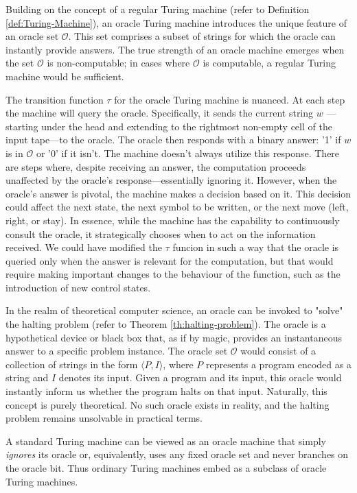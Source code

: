 Building on the concept of a regular Turing machine (refer to Definition \ref{def:Turing-Machine}), an oracle Turing machine introduces the unique feature of an oracle set $\mathcal{O}$. This set comprises a subset of strings for which the oracle can instantly provide answers. The true strength of an oracle machine emerges when the set $\mathcal{O}$ is non-computable; in cases where $\mathcal{O}$ is computable, a regular Turing machine would be sufficient.

The transition function $\tau$ for the oracle Turing machine is nuanced. At each step the machine will query the oracle. Specifically, it sends the current string $w$ —starting under the head and extending to the rightmost non-empty cell of the input tape—to the oracle. The oracle then responds with a binary answer: '1' if $w$ is in $\mathcal{O}$ or '0' if it isn't. The machine doesn't always utilize this response. There are steps where, despite receiving an answer, the computation proceeds unaffected by the oracle's response—essentially ignoring it. However, when the oracle's answer is pivotal, the machine makes a decision based on it. This decision could affect the next state, the next symbol to be written, or the next move (left, right, or stay). In essence, while the machine has the capability to continuously consult the oracle, it strategically chooses when to act on the information received. We could have modified the $\tau$ funcion in such a way that the oracle is queried only when the answer is relevant for the computation, but that would require making important changes to the behaviour of the function, such as the introduction of new control states.

\begin{example}
In the realm of theoretical computer science, an oracle can be invoked to "solve" the halting problem (refer to Theorem \ref{th:halting-problem}). The oracle is a hypothetical device or black box that, as if by magic, provides an instantaneous answer to a specific problem instance. The oracle set $\mathcal{O}$ would consist of a collection of strings in the form $\langle P, I \rangle$, where $P$ represents a program encoded as a string and $I$ denotes its input. Given a program and its input, this oracle would instantly inform us whether the program halts on that input. Naturally, this concept is purely theoretical. No such oracle exists in reality, and the halting problem remains unsolvable in practical terms.
\end{example}

A standard Turing machine can be viewed as an oracle machine that simply \emph{ignores} its oracle or, equivalently, uses any fixed oracle set and never branches on the oracle bit. Thus ordinary Turing machines embed as a subclass of oracle Turing machines.

